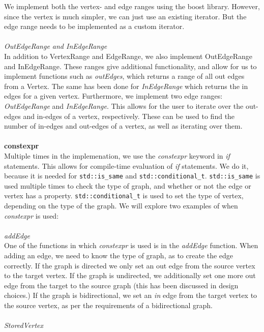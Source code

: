 \documentclass{article}
\begin{document}
We implement both the vertex- and edge ranges using the boost library. However, since the vertex is much simpler, we can just use an existing iterator. But the edge range needs to be implemented as a custom iterator.
\\\\
\textit{OutEdgeRange and InEdgeRange}\\
In addition to VertexRange and EdgeRange, we also implement OutEdgeRange and InEdgeRange. These ranges give additional functionality, and allow for us to implement functions such as \textit{outEdges}, which returns a range of all out edges from a Vertex. The same has been done for \textit{InEdgeRange} which returns the in edges for a given vertex. 
Furthermore, we implement two edge ranges: \textit{OutEdgeRange} and \textit{InEdgeRange}. This allows for the user to iterate over the out-edges and in-edges of a vertex, respectively. These can be used to find the number of in-edges and out-edges of a vertex, as well as iterating over them. 
\\\\
\noindent
\textbf{constexpr}\\
\noindent
Multiple times in the implemenation, we use the \textit{constexpr} keyword in \textit{if} statements. This allows for compile-time evaluation of \textit{if} statements. 
We do it, because it is needed for \texttt{std::is\_same} and \texttt{std::conditional\_t}. \texttt{std::is\_same} is used multiple times to check the type of graph, and whether or not the edge or vertex has a property. 
\texttt{std::conditional\_t} is used to set the type of vertex, depending on the type of the graph. We will explore two examples of when 
\textit{constexpr} is used:
\\\\
\noindent
\textit{addEdge}\\
\noindent
One of the functions in which \textit{constexpr} is used is in the \textit{addEdge} function. 
When adding an edge, we need to know the type of graph, as to create the edge correctly. If the graph is directed we only set an out edge from the source vertex to the target vertex. If the graph is undirected, we additionally set one more out edge from the target to the source graph (this has been discussed in design choices.) If the graph is bidirectional, we set an \textit{in} edge from the target vertex to the source vertex, as per the requirements of a bidirectional graph.
\\\\
\noindent
\textit{StoredVertex}\\
\end{document}
